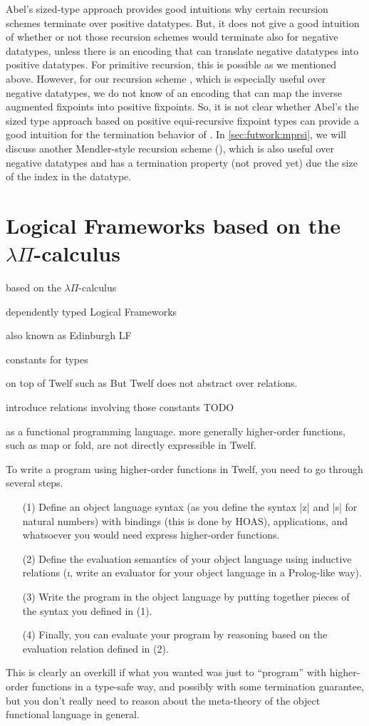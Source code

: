 Abel's sized-type approach provides good intuitions why 
certain recursion schemes terminate over positive datatypes.
But, it does not give a good intuition of whether or not
those recursion schemes would terminate also for negative datatypes,
unless there is an encoding that can translate negative datatypes into
positive datatypes. For primitive recursion, this is possible as we
mentioned above. However, for our recursion scheme \MsfIt, which is
especially useful over negative datatypes, we do not know of an encoding
that can map the inverse augmented fixpoints into positive fixpoints.
So, it is not clear whether Abel's the sized type approach based on
positive equi-recursive fixpoint types can provide a good intuition
for the termination behavior of \MsfIt.  In \ref{sec:futwork:mprsi},
we will discuss another Mendler-style recursion scheme (\mprsi), which
is also useful over negative datatypes and has a termination property
(not proved yet) due the size of the index in the datatype.

\section{Logical Frameworks based on the $\lambda\Pi$-calculus}

based on the $\lambda\Pi$-calculus

dependently typed Logical Frameworks 

also known as Edinburgh LF \cite{TODO}

constants for types

on top of Twelf such as
But Twelf does not abstract over relations.

introduce relations involving those constants
TODO

as a functional programming language.
more generally higher-order functions, such as map or fold,
are not directly expressible in Twelf.

To write a program using higher-order functions in Twelf,
you need to go through several steps.
\begin{itemize}
\item[(1)] Define an object language syntax
(as you define the syntax |z| and |s| for natural numbers)
with bindings (this is done by HOAS), applications, and
whatsoever you would need express higher-order functions.
\item[(2)] Define the evaluation semantics of your object language using
	inductive relations (\i, write an evaluator for
	your object language in a Prolog-like way).
\item[(3)] Write the program in the object language by putting
	together pieces of the syntax you defined in (1).
\item[(4)] Finally, you can evaluate your program by reasoning based on
	the evaluation relation defined in (2).
\end{itemize}
This is clearly an overkill if what you wanted was just to ``program''
with higher-order functions in a type-safe way, and possibly with some
termination guarantee, but you don't really need to reason about
the meta-theory of the object functional language in general.

